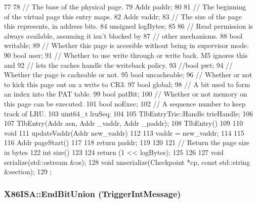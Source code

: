 \begin{DoxyCode}
77     {
78         // The base of the physical page.
79         Addr paddr;
80 
81         // The beginning of the virtual page this entry maps.
82         Addr vaddr;
83         // The size of the page this represents, in address bits.
84         unsigned logBytes;
85 
86         // Read permission is always available, assuming it isn't blocked by
87         // other mechanisms.
88         bool writable;
89         // Whether this page is accesible without being in supervisor mode.
90         bool user;
91         // Whether to use write through or write back. M5 ignores this and
92         // lets the caches handle the writeback policy.
93         //bool pwt;
94         // Whether the page is cacheable or not.
95         bool uncacheable;
96         // Whether or not to kick this page out on a write to CR3.
97         bool global;
98         // A bit used to form an index into the PAT table.
99         bool patBit;
100         // Whether or not memory on this page can be executed.
101         bool noExec;
102         // A sequence number to keep track of LRU.
103         uint64_t lruSeq;
104 
105         TlbEntryTrie::Handle trieHandle;
106 
107         TlbEntry(Addr asn, Addr _vaddr, Addr _paddr);
108         TlbEntry() {}
109 
110         void
111         updateVaddr(Addr new_vaddr)
112         {
113             vaddr = new_vaddr;
114         }
115 
116         Addr pageStart()
117         {
118             return paddr;
119         }
120 
121         // Return the page size in bytes
122         int size()
123         {
124             return (1 << logBytes);
125         }
126 
127         void serialize(std::ostream &os);
128         void unserialize(Checkpoint *cp, const std::string &section);
129     };
\end{DoxyCode}
\hypertarget{namespaceX86ISA_a476612a8853e8ae8eeb1e409d16d9732}{
\subsubsection[{EndBitUnion}]{\setlength{\rightskip}{0pt plus 5cm}X86ISA::EndBitUnion (TriggerIntMessage)}}
\label{namespaceX86ISA_a476612a8853e8ae8eeb1e409d16d9732}



